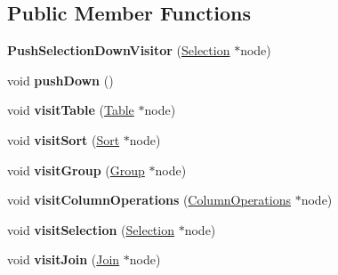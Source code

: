 \subsection*{Public Member Functions}
\begin{DoxyCompactItemize}
\item 
\hypertarget{class_push_selection_down_visitor_a1be0a28ee1650a54e5c23af1d8effc54}{{\bfseries Push\+Selection\+Down\+Visitor} (\hyperlink{class_selection}{Selection} $\ast$node)}\label{class_push_selection_down_visitor_a1be0a28ee1650a54e5c23af1d8effc54}

\item 
\hypertarget{class_push_selection_down_visitor_a343e4e8b9742602455232d5877bf2e15}{void {\bfseries push\+Down} ()}\label{class_push_selection_down_visitor_a343e4e8b9742602455232d5877bf2e15}

\item 
\hypertarget{class_push_selection_down_visitor_af848a068e14d7c1227fc19411607c463}{void {\bfseries visit\+Table} (\hyperlink{class_table}{Table} $\ast$node)}\label{class_push_selection_down_visitor_af848a068e14d7c1227fc19411607c463}

\item 
\hypertarget{class_push_selection_down_visitor_a15fb2f0fb19d10c40405c4683fd2a2d8}{void {\bfseries visit\+Sort} (\hyperlink{class_sort}{Sort} $\ast$node)}\label{class_push_selection_down_visitor_a15fb2f0fb19d10c40405c4683fd2a2d8}

\item 
\hypertarget{class_push_selection_down_visitor_a551561414b97bce56c1bba3829ff9769}{void {\bfseries visit\+Group} (\hyperlink{class_group}{Group} $\ast$node)}\label{class_push_selection_down_visitor_a551561414b97bce56c1bba3829ff9769}

\item 
\hypertarget{class_push_selection_down_visitor_a09ade5d0a2d194fee1b5b555d36104a4}{void {\bfseries visit\+Column\+Operations} (\hyperlink{class_column_operations}{Column\+Operations} $\ast$node)}\label{class_push_selection_down_visitor_a09ade5d0a2d194fee1b5b555d36104a4}

\item 
\hypertarget{class_push_selection_down_visitor_a2534debe115bf3f6648281cc6d0d10ac}{void {\bfseries visit\+Selection} (\hyperlink{class_selection}{Selection} $\ast$node)}\label{class_push_selection_down_visitor_a2534debe115bf3f6648281cc6d0d10ac}

\item 
\hypertarget{class_push_selection_down_visitor_a25ff28bccfd9c35119d06117e63465be}{void {\bfseries visit\+Join} (\hyperlink{class_join}{Join} $\ast$node)}\label{class_push_selection_down_visitor_a25ff28bccfd9c35119d06117e63465be}


\end{DoxyCompactItemize}
